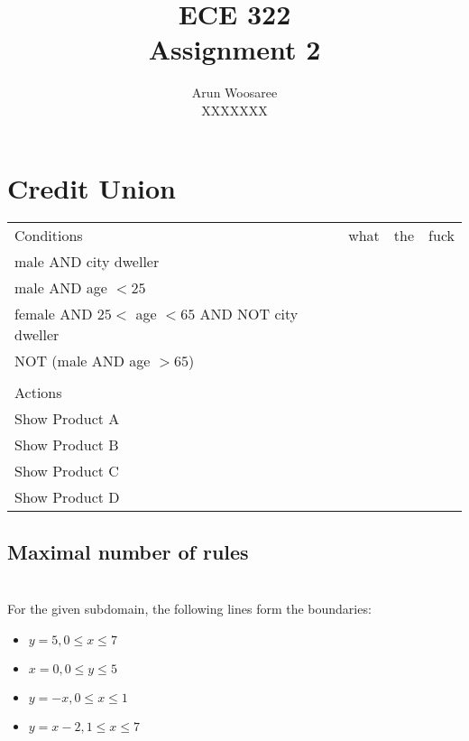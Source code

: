 \documentclass[letterpaper]{article}
\title{ECE 322 \\
Assignment 2}
\author{Arun Woosaree\\
  XXXXXXX}
\begin{document}
\maketitle %

\section{Credit Union}
\begin{adjustbox}{center}
	\begin{tabularx}{\textwidth}{llll}
Conditions                                & what & the & fuck \\ \cline{1-1}
male AND city dweller                     &      &     &      \\
male AND age $<25$                         &      &     &      \\
female AND $25<$ age $<65$ AND NOT city dweller &      &     &      \\
NOT (male AND age $>65$)                   &      &     &      \\
					  &      &     &      \\
Actions                                   &      &     &      \\ \cline{1-1}
Show Product A                            &      &     &      \\
Show Product B                            &      &     &      \\
Show Product C                            &      &     &      \\
Show Product D                            &      &     &     
\end{tabularx}%
\end{adjustbox}
\subsection{Maximal number of rules}

\subsection{}

\section{}
For the given subdomain, the following lines form the boundaries:
 \begin{itemize}                                                                 
         \item $y=5, 0\leq x\leq 7$                                              
         \item $x=0, 0\leq y \leq 5$                                             
         \item $y=-x, 0\leq x\leq 1$                                             
         \item $y=x-2, 1\leq x \leq 7$                                           
 \end{itemize}
\end{document}

